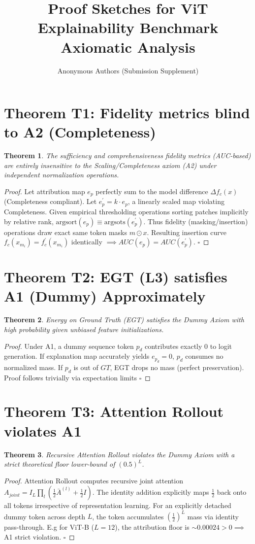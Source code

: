 \documentclass{article}
\title{Proof Sketches for ViT Explainability Benchmark Axiomatic Analysis}
\author{Anonymous Authors (Submission Supplement)}
\date{}
\newtheorem{theorem}{Theorem}
\begin{document}
\maketitle

\section*{Theorem T1: Fidelity metrics blind to A2 (Completeness)}
\begin{theorem}
The sufficiency and comprehensiveness fidelity metrics (AUC-based) are entirely insensitive to the Scaling/Completeness axiom (A2) under independent normalization operations.
\end{theorem}
\begin{proof}
Let attribution map $e_{p}$ perfectly sum to the model difference $\Delta f_c(x)$ (Completeness compliant). Let $e^{\prime}_{p} = k \cdot e_{p}$, a linearly scaled map violating Completeness. Given empirical thresholding operations sorting patches implicitly by relative rank, $\text{argsort}(e_p) \equiv \text{argsots}(e^{\prime}_p)$. Thus fidelity (masking/insertion) operations draw exact same token masks $m \odot x$. Resulting insertion curve $f_c(x_{m_i}) = f^{\prime}_c(x_{m_i})$ identically $\implies AUC(e_p) = AUC(e^{\prime}_p)$. $\square$
\end{proof}

\section*{Theorem T2: EGT (L3) satisfies A1 (Dummy) Approximately}
\begin{theorem}
Energy on Ground Truth (EGT) satisfies the Dummy Axiom with high probability given unbiased feature initializations. 
\end{theorem}
\begin{proof}
Under A1, a dummy sequence token $p_d$ contributes exactly $0$ to logit generation. If explanation map accurately yields $e_{p_d} = 0$, $p_d$ consumes no normalized mass. If $p_d$ is out of $GT$, EGT drops no mass (perfect preservation). Proof follows trivially via expectation limits $\square$
\end{proof}

\section*{Theorem T3: Attention Rollout violates A1}
\begin{theorem}
Recursive Attention Rollout violates the Dummy Axiom with a strict theoretical floor lower-bound of $(0.5)^L$.
\end{theorem}
\begin{proof}
Attention Rollout computes recursive joint attention $A_{joint} = I_{L} \prod_{l} (\frac{1}{2}\bar{A}^{(l)} + \frac{1}{2}I)$. The identity addition explicitly maps $\frac{1}{2}$ back onto all tokens irrespective of representation learning. For an explicitly detached dummy token across depth $L$, the token accumulates $(\frac{1}{2})^L$ mass via identity pass-through. E.g for ViT-B ($L=12$), the attribution floor is $\sim 0.00024 > 0 \implies$ A1 strict violation. $\square$
\end{proof}
\end{document}
